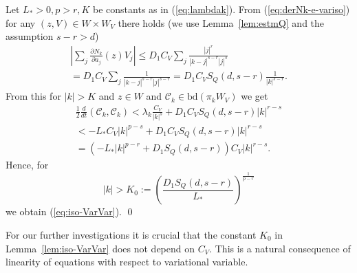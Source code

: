 Let $L_*>0, p>r, K$ be constants as in (\ref{eq:lambdak}). From (\ref{eq:derNk-e-variso}) for any $(z,V) \in W\times W_V$ there holds (we use Lemma~\ref{lem:estmQ} and the assumption $s-r>d$)
\begin{eqnarray*}
  \left|\sum_j \frac{\partial N_k}{\partial a_j}(z)V_j \right| \leq  D_1 C_V \sum_j \frac{|j|^r}{|k-j|^{s-r} |j|^{s}}\\
  =D_1 C_V \sum_j \frac{1}{|k-j|^{s-r} |j|^{s-r}}=
  D_1 C_V S_Q(d,s-r) \frac{1}{|k|^{s-r}}.
\end{eqnarray*}
From this for $|k|>K$ and $z\in W$ and $\mathcal C_k\in\mathrm{bd}(\pi_k W_V)$ we get
\begin{multline*}
	\frac{1}{2}\frac{d}{dt}(\mathcal{C}_k,\mathcal{C}_k)  < \lambda_k\frac{C_V}{|k|^s} + D_1 C_V S_Q(d,s-r) |k|^{r-s}\\
	< -L_* C_V|k|^{p-s} + D_1 C_V S_Q(d,s-r)|k|^{r-s} \\
	= \left(-L_*|k|^{p-r} + D_1 S_Q(d,s-r) \right)C_V|k|^{r-s}.
\end{multline*}
Hence, for
\begin{equation*}
	|k| > K_0:=\left(\frac{D_1 S_Q(d,s-r)}{L_*} \right)^{\frac{1}{p-r}}
\end{equation*}
we obtain (\ref{eq:iso-VarVar}).
\qed

\begin{remark}
For our further investigations it is crucial that the constant $K_0$ in Lemma~\ref{lem:iso-VarVar} does not depend on $C_V$. This is a natural consequence of linearity of equations with respect to variational variable.
\end{remark} 